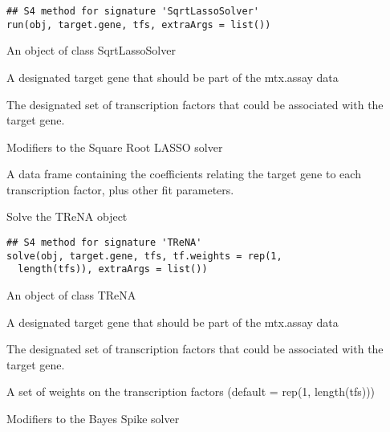 \documentclass[a4paper]{book}
\begin{document}
%
\begin{Usage}
\begin{verbatim}
## S4 method for signature 'SqrtLassoSolver'
run(obj, target.gene, tfs, extraArgs = list())
\end{verbatim}
\end{Usage}
%
\begin{Arguments}
\begin{ldescription}
\item[\code{obj}] An object of class SqrtLassoSolver

\item[\code{target.gene}] A designated target gene that should be part of the mtx.assay data

\item[\code{tfs}] The designated set of transcription factors that could be associated with the target gene.

\item[\code{extraArgs}] Modifiers to the Square Root LASSO solver
\end{ldescription}
\end{Arguments}
%
\begin{Value}
A data frame containing the coefficients relating the target gene to each transcription factor, plus other fit parameters.
\end{Value}
%
\begin{SeeAlso}\relax
{}
\end{SeeAlso}
%
\begin{Description}\relax
Solve the TReNA object
\end{Description}
%
\begin{Usage}
\begin{verbatim}
## S4 method for signature 'TReNA'
solve(obj, target.gene, tfs, tf.weights = rep(1,
  length(tfs)), extraArgs = list())
\end{verbatim}
\end{Usage}
%
\begin{Arguments}
\begin{ldescription}
\item[\code{obj}] An object of class TReNA

\item[\code{target.gene}] A designated target gene that should be part of the mtx.assay data

\item[\code{tfs}] The designated set of transcription factors that could be associated with the target gene.

\item[\code{tf.weights}] A set of weights on the transcription factors (default = rep(1, length(tfs)))

\item[\code{extraArgs}] Modifiers to the Bayes Spike solver
\end{ldescription}
\end{Arguments}
\end{document}

